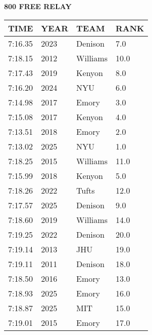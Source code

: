 \begin{center}
\begin{minipage}[t]{0.7\textwidth}
\centering
\textbf{800 FREE RELAY}\\[0.05cm]
\begin{tabular}{@{}p{1.8cm}p{1.2cm}p{1.4cm}p{0.8cm}@{}}
\hline
\textbf{TIME} & \textbf{YEAR} & \textbf{TEAM} & \textbf{RANK} \\
\hline
7:16.35 & 2023 & Denison & 7.0 \\
7:18.15 & 2012 & Williams & 10.0 \\
7:17.43 & 2019 & Kenyon & 8.0 \\
7:16.20 & 2024 & NYU & 6.0 \\
7:14.98 & 2017 & Emory & 3.0 \\
7:15.08 & 2017 & Kenyon & 4.0 \\
7:13.51 & 2018 & Emory & 2.0 \\
7:13.02 & 2025 & NYU & 1.0 \\
7:18.25 & 2015 & Williams & 11.0 \\
7:15.99 & 2018 & Kenyon & 5.0 \\
7:18.26 & 2022 & Tufts & 12.0 \\
7:17.57 & 2025 & Denison & 9.0 \\
7:18.60 & 2019 & Williams & 14.0 \\
7:19.25 & 2022 & Denison & 20.0 \\
7:19.14 & 2013 & JHU & 19.0 \\
7:19.11 & 2011 & Denison & 18.0 \\
7:18.50 & 2016 & Emory & 13.0 \\
7:18.93 & 2025 & Emory & 16.0 \\
7:18.87 & 2025 & MIT & 15.0 \\
7:19.01 & 2015 & Emory & 17.0 \\
\hline
\end{tabular}
\end{minipage}
\end{center}

\vspace{0.4cm}

